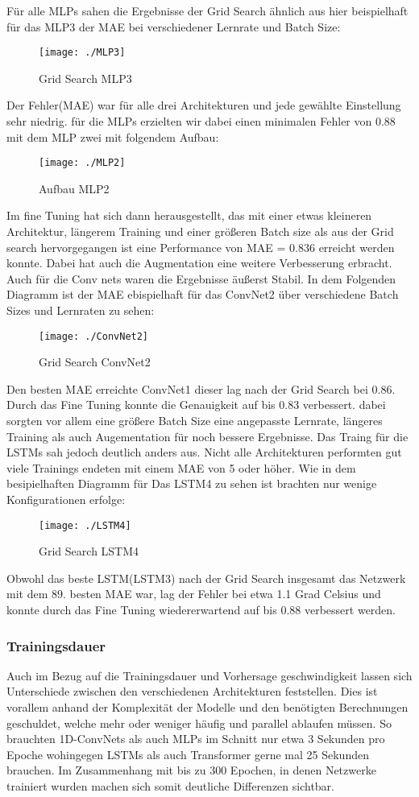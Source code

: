 \documentclass[acmtog, authorversion]{acmart} %
\begin{document}
Für alle MLPs sahen die Ergebnisse der Grid Search ähnlich aus hier beispielhaft für das MLP3 der MAE bei verschiedener Lernrate und Batch Size:
\begin{figure}[H]
    \flushleft
    \texttt{[image: ./MLP3]}
    \label{fig:sub4}
    \caption{Grid Search MLP3}
\end{figure}
Der Fehler(MAE) war für alle drei Architekturen und jede gewählte Einstellung sehr niedrig. für die MLPs erzielten wir dabei einen minimalen Fehler von 0.88 mit dem MLP zwei mit folgendem Aufbau: 
\begin{figure}[H]
    \centering
    \texttt{[image: ./MLP2]}
    \label{fig:sub5}
    \caption{Aufbau MLP2}
\end{figure}
Im fine Tuning hat sich dann herausgestellt, das mit einer etwas kleineren Architektur, längerem Training und einer größeren Batch size als aus der Grid search hervorgegangen ist eine Performance von MAE = 0.836 erreicht werden konnte. Dabei hat auch die Augmentation eine weitere Verbesserung erbracht.
Auch für die Conv nets waren die Ergebnisse äußerst Stabil. In dem Folgenden Diagramm ist der MAE ebispielhaft für das ConvNet2 über verschiedene Batch Sizes und Lernraten zu sehen:
\begin{figure}[H]
    \centering
    \texttt{[image: ./ConvNet2]}
    \label{fig:sub6}
    \caption{Grid Search ConvNet2}
\end{figure}
Den besten MAE erreichte ConvNet1 dieser lag nach der Grid Search bei 0.86. Durch das Fine Tuning konnte die Genauigkeit auf bis 0.83 verbessert. dabei sorgten vor allem eine größere Batch Size eine angepasste Lernrate, längeres Training als auch Augementation für noch bessere Ergebnisse.
Das Traing für die LSTMs sah jedoch deutlich anders aus. Nicht alle Architekturen performten gut viele Trainings endeten mit einem MAE von 5 oder höher. Wie in dem besipielhaften Diagramm für Das LSTM4 zu sehen ist brachten nur wenige Konfigurationen erfolge:
\begin{figure}[H]
    \centering
    \texttt{[image: ./LSTM4]}
    \label{fig:sub7}
    \caption{Grid Search LSTM4}
\end{figure}
Obwohl das beste LSTM(LSTM3) nach der Grid Search insgesamt das Netzwerk mit dem 89. besten MAE war, lag der Fehler bei etwa 1.1 Grad Celsius und konnte durch das Fine Tuning wiedererwartend auf bis 0.88 verbessert werden.

\subsubsection{Trainingsdauer}
Auch im Bezug auf die Trainingsdauer und Vorhersage geschwindigkeit lassen sich Unterschiede zwischen den verschiedenen Architekturen feststellen. 
Dies ist vorallem anhand der Komplexität der Modelle und den benötigten Berechnungen geschuldet, welche mehr oder weniger häufig und parallel ablaufen müssen.
So brauchten 1D-ConvNets als auch MLPs im Schnitt nur etwa 3 Sekunden pro Epoche wohingegen LSTMs als auch Transformer gerne mal 25 Sekunden brauchen.
Im Zusammenhang mit bis zu 300 Epochen, in denen Netzwerke trainiert wurden machen sich somit deutliche Differenzen sichtbar.
\end{document}
